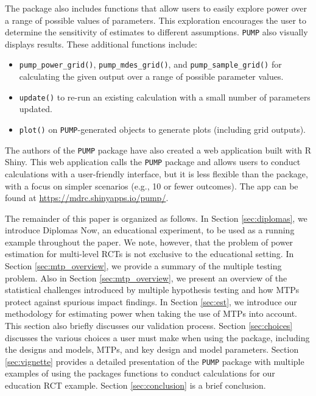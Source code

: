 \documentclass[
]{article}
\providecommand{\tightlist}{%
  \setlength{\itemsep}{0pt}\setlength{\parskip}{0pt}}
\begin{document}
The package also includes functions that allow users to easily explore
power over a range of possible values of parameters. This exploration
encourages the user to determine the sensitivity of estimates to
different assumptions. \texttt{PUMP} also visually displays results.
These additional functions include:

\begin{itemize}
\tightlist
\item
  \texttt{pump\_power\_grid()}, \texttt{pump\_mdes\_grid()}, and
  \texttt{pump\_sample\_grid()} for calculating the given output over a
  range of possible parameter values.
\item
  \texttt{update()} to re-run an existing calculation with a small
  number of parameters updated.
\item
  \texttt{plot()} on \texttt{PUMP}-generated objects to generate plots
  (including grid outputs).
\end{itemize}

The authors of the \texttt{PUMP} package have also created a web
application built with R Shiny. This web application calls the
\texttt{PUMP} package and allows users to conduct calculations with a
user-friendly interface, but it is less flexible than the package, with
a focus on simpler scenarios (e.g., 10 or fewer outcomes). The app can
be found at \url{https://mdrc.shinyapps.io/pump/}.

The remainder of this paper is organized as follows. In Section
\ref{sec:diplomas}, we introduce Diplomas Now, an educational
experiment, to be used as a running example throughout the paper. We
note, however, that the problem of power estimation for multi-level RCTs
is not exclusive to the educational setting. In Section
\ref{sec:mtp_overview}, we provide a summary of the multiple testing
problem. Also in Section \ref{sec:mtp_overview}, we present an overview
of the statistical challenges introduced by multiple hypothesis testing
and how MTPs protect against spurious impact findings. In Section
\ref{sec:est}, we introduce our methodology for estimating power when
taking the use of MTPs into account. This section also briefly discusses
our validation process. Section \ref{sec:choices} discusses the various
choices a user must make when using the package, including the designs
and models, MTPs, and key design and model parameters. Section
\ref{sec:vignette} provides a detailed presentation of the \texttt{PUMP}
package with multiple examples of using the packages functions to
conduct calculations for our education RCT example. Section
\ref{sec:conclusion} is a brief conclusion.
\end{document}
